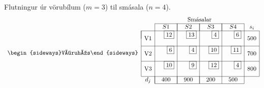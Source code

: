 \begin{daemi}\label{daemi:vorusmabilar}Flutningur úr vörubílum ($m=3$) til smásala ($n=4$).
\[ \begin{array}{cccr|cr|cr|crcc}
 & & \multicolumn{8}{c}{\mbox{Smásalar}} \\ \cline{3-10}
 & & \multicolumn{2}{|c|}{S1} & \multicolumn{2}{|c|}{S2} & \multicolumn{2}{|c|}{S3}& \multicolumn{2}{|c|}{S4} & s_i \\ \cline{2-11}
\multicolumn{1}{c|}{\multirow{6}{*}{\begin{sideways}Vöruhús\end{sideways}}} 
& \multicolumn{1}{|c|}{\multirow{2}{*}{V1}} &   & \scriptscriptstyle{\fbox{12}}&    & \scriptscriptstyle{\fbox{13}} & & \scriptscriptstyle{\fbox{4}}& & \scriptscriptstyle{\fbox{6}} & \multicolumn{1}{|c|}{\multirow{2}{*}{500}}  \\ 
& \multicolumn{1}{|c|}{                  } & &    & &    & &   & & & \multicolumn{1}{|c|}{}\\ \cline{2-11}
& \multicolumn{1}{|c|}{\multirow{2}{*}{V2}} &   & \scriptscriptstyle{\fbox{6}}&    & \scriptscriptstyle{\fbox{4}} & & \scriptscriptstyle{\fbox{10}}& & \scriptscriptstyle{\fbox{11}} & \multicolumn{1}{|c|}{\multirow{2}{*}{700}}  \\ 
& \multicolumn{1}{|c|}{                  } & &    & &    & & &&   & \multicolumn{1}{|c|}{}\\ \cline{2-11}
& \multicolumn{1}{|c|}{\multirow{2}{*}{V3}} &   & \scriptscriptstyle{\fbox{10}}&    & \scriptscriptstyle{\fbox{9}} &  & \scriptscriptstyle{\fbox{12}} & & \scriptscriptstyle{\fbox{4}} & \multicolumn{1}{|c|}{\multirow{2}{*}{800}} \\ 
& \multicolumn{1}{|c|}{                  } & &    & &    & &   & & & \multicolumn{1}{|c|}{}\\ \cline{2-11}
&  \multicolumn{1}{c|}{d_j}& \multicolumn{2}{|c|}{400} & \multicolumn{2}{|c|}{900} & \multicolumn{2}{|c}{200} &\multicolumn{2}{|c|}{500} & \\ \cline{3-10}
\end{array}
\]
\end{daemi}
